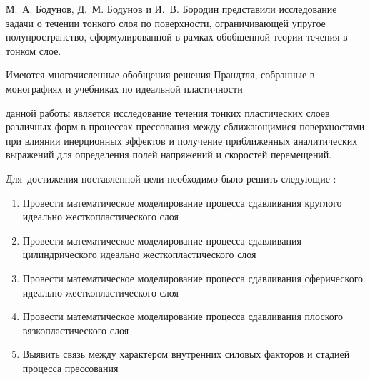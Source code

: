 М.~А. Бодунов, Д.~М. Бодунов и И.~В. Бородин \autocite{Bodunov:2013} представили исследование задачи о течении тонкого слоя по поверхности, ограничивающей упругое полупространство, сформулированной в рамках обобщенной теории течения в тонком слое.

Имеются многочисленные обобщения решения Прандтля, собранные в монографиях и учебниках по идеальной пластичности \autocite{Bikovcev:1998, Browman:1965, Gromov:1978, Gubkin:1959, Hill:1956, Ishlinsky:2001, Ivlev:2001, Ivlev:2002, Kachanov:1969, Kolmogorov:2001, Korolev:1969, Mihin:1968, Nadai:1954, Pavlov:1950, Perlin:1964, Prager:1956, Sokolovskiy:1969, Storozhev:1977, Tarnovsky:1963, Tomlenov:1963, Tomlenov:1972, Tomsen:1965, Tselikov:1965, Tselikov:1965, Unksov:1955, Zadoyan:1992}
\fi


{\aim} данной работы является исследование течения тонких пластических слоев различных форм в процессах прессования между сближающимися поверхностями при влиянии инерционных эффектов и получение приближенных аналитических выражений для определения полей напряжений и скоростей перемещений.

Для~достижения поставленной цели необходимо было решить следующие {\tasks}:
\begin{enumerate}[beginpenalty=10000] %
    \item Провести математическое моделирование процесса сдавливания круглого идеально жесткопластического слоя
    \item Провести математическое моделирование процесса сдавливания цилиндрического идеально жесткопластического слоя
    \item Провести математическое моделирование процесса сдавливания сферического идеально жесткопластического слоя
    \item Провести математическое моделирование процесса сдавливания плоского вязкопластического слоя
    \item Выявить связь между характером внутренних силовых факторов и стадией процесса прессования
\end{enumerate}


